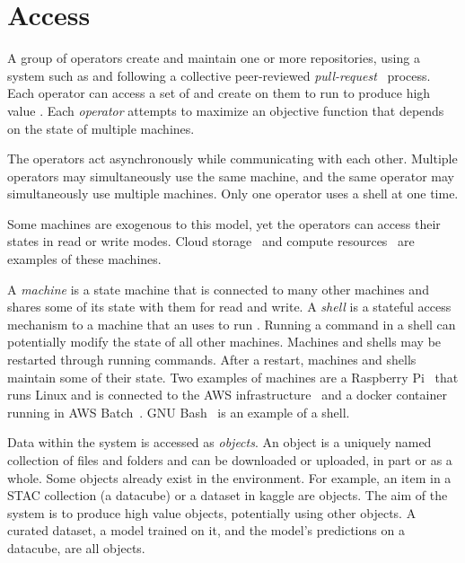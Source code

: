 \section{Access}

A group of operators create and maintain one or more repositories, using a system such as  and following a collective peer-reviewed \emph{pull-request}~\cite{pull_request} process. Each operator can access a set of  and create  on them to run  to produce high value . Each \emph{operator} attempts to maximize an objective function that depends on the state of multiple machines.

The operators act asynchronously while communicating with each other. Multiple operators may simultaneously use the same machine, and the same operator may simultaneously use multiple machines. Only one operator uses a shell at one time. 

Some machines are exogenous to this model, yet the operators can access their states in read or write modes. Cloud storage~\cite{aws_s3} and compute resources~\cite{aws_batch} are examples of these machines.

A \emph{machine} is a state machine that is connected to many other machines and shares some of its state with them for read and write. A \emph{shell} is a stateful access mechanism to a machine that an  uses to run . Running a command in a shell can potentially modify the state of all other machines. Machines and shells may be restarted through running commands. After a restart, machines and shells maintain some of their state. Two examples of machines are a Raspberry Pi~\cite{rpi} that runs Linux and is connected to the AWS infrastructure~\cite{aws} and a docker container~\cite{docker} running in AWS Batch~\cite{aws_batch}. GNU Bash~\cite{gnu_bash} is an example of a shell.

Data within the system is accessed as \emph{objects}. An object is a uniquely named collection of files and folders and can be downloaded or uploaded, in part or as a whole. Some objects already exist in the environment. For example, an item in a STAC collection (a datacube) or a dataset in kaggle are objects. The aim of the system is to produce high value objects, potentially using other objects. A curated dataset, a model trained on it, and the model's predictions on a datacube, are all objects.

